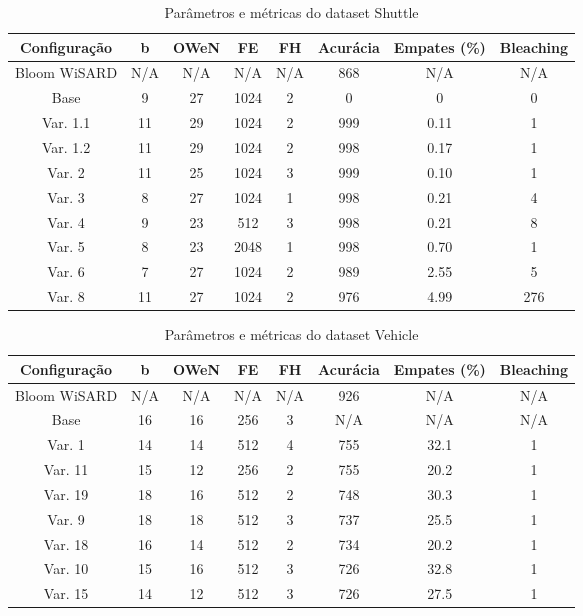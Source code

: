 \documentclass{article}
\begin{document}
{\begin{table}[H]
\caption{Parâmetros e métricas do dataset Shuttle}
\begin{tabular}{|c|c|c|c|c|c|c|c|}
\hline
\textbf{Configuração} & \textbf{b} & \textbf{OWeN} & \textbf{FE} & \textbf{FH} & \textbf{Acurácia} & \textbf{Empates (\%)} & \textbf{Bleaching} \\
\hline
Bloom WiSARD & N/A & N/A & N/A & N/A & 868 & N/A & N/A \\
\hline
Base & 9 & 27 & 1024 & 2 & 0 & 0 & 0 \\
\hline
Var. 1.1 & 11 & 29 & 1024 & 2 & 999 & 0.11 & 1 \\
\hline
Var. 1.2 & 11 & 29 & 1024 & 2 & 998 & 0.17 & 1 \\
\hline
Var. 2 & 11 & 25 & 1024 & 3 & 999 & 0.10 & 1 \\
\hline
Var. 3 & 8 & 27 & 1024 & 1 & 998 & 0.21 & 4 \\
\hline
Var. 4 & 9 & 23 & 512 & 3 & 998 & 0.21 & 8 \\
\hline
Var. 5 & 8 & 23 & 2048 & 1 & 998 & 0.70 & 1 \\
\hline
Var. 6 & 7 & 27 & 1024 & 2 & 989 & 2.55 & 5 \\
\hline
Var. 8 & 11 & 27 & 1024 & 2 & 976 & 4.99 & 276 \\
\hline
\end{tabular}
\end{table}

\begin{table}[H]
\caption{Parâmetros e métricas do dataset Vehicle}
\begin{tabular}{|c|c|c|c|c|c|c|c|}
\hline
\textbf{Configuração} & \textbf{b} & \textbf{OWeN} & \textbf{FE} & \textbf{FH} & \textbf{Acurácia} & \textbf{Empates (\%)} & \textbf{Bleaching} \\
\hline
Bloom WiSARD & N/A & N/A & N/A & N/A & 926 & N/A & N/A \\
\hline
Base & 16 & 16 & 256 & 3 & N/A & N/A & N/A \\
\hline
Var. 1 & 14 & 14 & 512 & 4 & 755 & 32.1 & 1 \\
\hline
Var. 11 & 15 & 12 & 256 & 2 & 755 & 20.2 & 1 \\
\hline
Var. 19 & 18 & 16 & 512 & 2 & 748 & 30.3 & 1 \\
\hline
Var. 9 & 18 & 18 & 512 & 3 & 737 & 25.5 & 1 \\
\hline
Var. 18 & 16 & 14 & 512 & 2 & 734 & 20.2 & 1 \\
\hline
Var. 10 & 15 & 16 & 512 & 3 & 726 & 32.8 & 1 \\
\hline
Var. 15 & 14 & 12 & 512 & 3 & 726 & 27.5 & 1 \\
\hline
\end{tabular}
\end{table}

}
\end{document}
